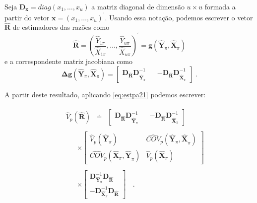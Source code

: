 \documentclass[]{book}
\theoremstyle{definition}
\theoremstyle{definition}
\theoremstyle{definition}
\theoremstyle{remark}
\begin{document}
Seja \(\mathbf{D}_{\mathbf{x}}=diag(x_{1},\ldots ,x_{u})\) a matriz
diagonal de dimensão \(u\times u\) formada a partir do vetor
\(\mathbf{x=}\left( x_{1},\ldots ,x_{u}\right) ^{^{\prime }}\). Usando
essa notação, podemos escrever o vetor \(\widehat{\mathbf{R}}\) de
estimadores das razões como \[
\widehat{\mathbf{R}}\mathbf{=}\left( \frac{\hat{Y}_{1\pi }}{\hat{X}_{1\pi }},\ldots ,\frac{\hat{Y}_{u\pi }}{\hat{X}_{u\pi }}\right) ^{^{\prime }}=\mathbf{g}\left( \mathbf{\hat{Y}}_{\pi },\mathbf{\hat{X}}_{\pi }\right)
\] e a correspondente matriz jacobiana como \[
\mathbf{\Delta g}\left( \mathbf{\hat{Y}}_{\pi },\mathbf{\hat{X}}_{\pi
}\right) =\left[ \begin{array}{lll}
\mathbf{\mathbf{D}_{\widehat{\mathbf{R}}}D}_{\mathbf{\hat{Y}}_{\pi }}^{-1} &\left. {}\right. & \mathbf{-\mathbf{D}_{\widehat{\mathbf{R}}}D}_{\mathbf{\hat{X}}_{\pi }}^{-1}
\end{array}
\right] \;. 
\]

A partir deste resultado, aplicando \eqref{eq:estpa21} podemos escrever:

\begin{eqnarray*}
&& 
\begin{array}{lll}
\widehat{V}_{p}\left( \widehat{\mathbf{R}}\right) & \doteq & \left[ 
\begin{array}{lll}
\mathbf{\mathbf{D}_{\widehat{\mathbf{R}}}D}_{\mathbf{\hat{Y}}_{\pi }}^{-1} & 
\left. {}\right. & \mathbf{-\mathbf{D}_{\widehat{\mathbf{R}}}D}_{\mathbf{\hat{X}}_{\pi }}^{-1}
\end{array}
\right]
\end{array}
\\
&& 
\begin{array}{lll}
&  & \times \left[ 
\begin{array}{cc}
\widehat{V}_{p}\left( \mathbf{\hat{Y}}_{\pi }\right) & \widehat{COV}_{p}\left( \mathbf{\hat{Y}}_{\pi }\mathbf{,\hat{X}}_{\pi }\right) \\ 
\widehat{COV}_{p}\left( \mathbf{\hat{X}}_{\pi }\mathbf{,\hat{Y}}_{\pi
}\right) & \widehat{V}_{p}\left( \mathbf{\hat{X}}_{\pi }\right)
\end{array}
\right]
\end{array}
\\
&& 
\begin{array}{lll}
&  & \times \left[ 
\begin{array}{l}
\mathbf{D}_{\mathbf{\hat{Y}}_{\pi }}^{-1}\mathbf{\mathbf{D}_{\widehat{
\mathbf{R}}}} \\ 
-\mathbf{D}_{\mathbf{\hat{X}}_{\pi }}^{-1}\mathbf{\mathbf{D}_{\widehat{
\mathbf{R}}}}
\end{array}
\right]
\end{array}
\;\;.
\end{eqnarray*}
\end{document}
